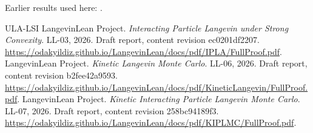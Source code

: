 \documentclass[11pt,a4paper]{article}
\begin{document}
Earlier results used here: \cite[Section~3.1.1]{LangevinLean2026IPLA}.

\begin{thebibliography}{ULA-LSI}
LangevinLean Project. \emph{Interacting Particle Langevin under Strong Convexity}. LL-03, 2026. Draft report, content revision ec0201df2207. \url{https://odakyildiz.github.io/LangevinLean/docs/pdf/IPLA/FullProof.pdf}.
LangevinLean Project. \emph{Kinetic Langevin Monte Carlo}. LL-06, 2026. Draft report, content revision b2fee42a9593. \url{https://odakyildiz.github.io/LangevinLean/docs/pdf/KineticLangevin/FullProof.pdf}.
LangevinLean Project. \emph{Kinetic Interacting Particle Langevin Monte Carlo}. LL-07, 2026. Draft report, content revision 258bc94189f3. \url{https://odakyildiz.github.io/LangevinLean/docs/pdf/KIPLMC/FullProof.pdf}.
\end{thebibliography}
\end{document}
